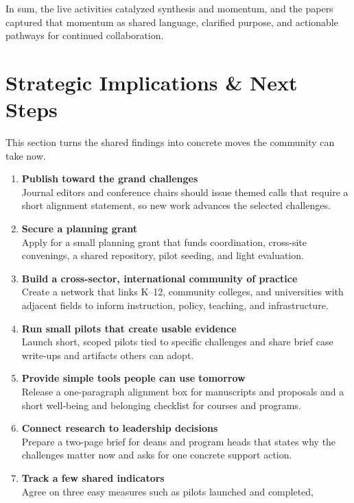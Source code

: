 \documentclass[
  letterpaper,
  DIV=11,
  numbers=noendperiod]{scrartcl}
\begin{document}
In sum, the live activities catalyzed synthesis and momentum, and the
papers captured that momentum as shared language, clarified purpose, and
actionable pathways for continued collaboration.

\section{Strategic Implications \& Next
Steps}\label{strategic-implications-next-steps}

This section turns the shared findings into concrete moves the community
can take now.

\begin{enumerate}
\def\labelenumi{\arabic{enumi}.}
\item
  \textbf{Publish toward the grand challenges}\\
  Journal editors and conference chairs should issue themed calls that
  require a short alignment statement, so new work advances the selected
  challenges.
\item
  \textbf{Secure a planning grant}\\
  Apply for a small planning grant that funds coordination, cross-site
  convenings, a shared repository, pilot seeding, and light evaluation.
\item
  \textbf{Build a cross-sector, international community of practice}\\
  Create a network that links K--12, community colleges, and
  universities with adjacent fields to inform instruction, policy,
  teaching, and infrastructure.
\item
  \textbf{Run small pilots that create usable evidence}\\
  Launch short, scoped pilots tied to specific challenges and share
  brief case write-ups and artifacts others can adopt.
\item
  \textbf{Provide simple tools people can use tomorrow}\\
  Release a one-paragraph alignment box for manuscripts and proposals
  and a short well-being and belonging checklist for courses and
  programs.
\item
  \textbf{Connect research to leadership decisions}\\
  Prepare a two-page brief for deans and program heads that states why
  the challenges matter now and asks for one concrete support action.
\item
  \textbf{Track a few shared indicators}\\
  Agree on three easy measures such as pilots launched and completed,

\end{enumerate}
\end{document}
